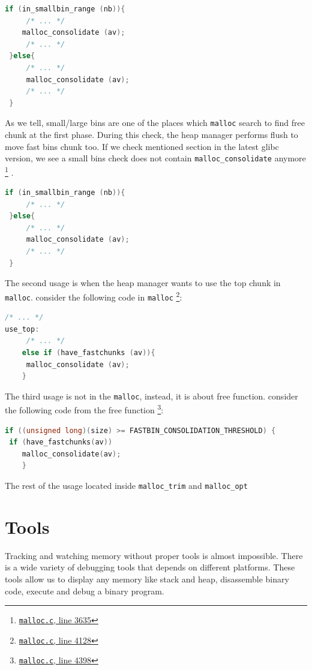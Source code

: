 \documentclass{masterthesis}
\newcommand*\libc{glibc}
\newcommand*\fb{fast bins}
\newcommand*\lb{large bins}
\newcommand*\sbs{small bins}
\newcommand*\mallocc{\lstinline{malloc}}
\begin{document}
\begin{lstlisting}[language=c,frame=tlrb]
 if (in_smallbin_range (nb)){
	 /* ... */
 	malloc_consolidate (av);
	 /* ... */
 }else{
	 /* ... */
	 malloc_consolidate (av);
	 /* ... */
 }
\end{lstlisting}

As we tell, small/\lb{} are one of the places which \mallocc{} search to find free chunk at the first phase. During this check, the heap manager performs flush to move \fb{} chunk too. If we check mentioned section in the latest \libc{} version, we see a \sbs{} check does not contain \lstinline{malloc_consolidate} anymore \footnote{\href{https://sourceware.org/git/?p=glibc.git;a=blob;f=malloc/malloc.c;h=f7cd29bc2f93e1082ee77800bd64a4b2a2897055;hb=9ea3686266dca3f004ba874745a4087a89682617\#l3635}{\texttt{malloc.c}, line 3635}} .

\begin{lstlisting}[language=c,frame=tlrb]
 if (in_smallbin_range (nb)){
 	 /* ... */
 }else{
	 /* ... */
	 malloc_consolidate (av);
	 /* ... */
 }
\end{lstlisting}

The second usage is when the heap manager wants to use the top chunk in \mallocc{}. consider the following code in \mallocc{} \footnote{\href{https://sourceware.org/git/?p=glibc.git;a=blob;f=malloc/malloc.c;h=f7cd29bc2f93e1082ee77800bd64a4b2a2897055;hb=9ea3686266dca3f004ba874745a4087a89682617\#l4128}{\texttt{malloc.c}, line 4128}}:

\begin{lstlisting}[language=c,frame=tlrb]
 /* ... */
use_top:
	 /* ... */
	else if (have_fastchunks (av)){
	 malloc_consolidate (av);
	}
\end{lstlisting}

The third usage is not in the \mallocc{}, instead, it is about free function. consider the following code from the free function \footnote{\href{https://sourceware.org/git/?p=glibc.git;a=blob;f=malloc/malloc.c;h=f7cd29bc2f93e1082ee77800bd64a4b2a2897055;hb=9ea3686266dca3f004ba874745a4087a89682617\#l4398}{\texttt{malloc.c}, line 4398}}:

\begin{lstlisting}[language=c,frame=tlrb]
if ((unsigned long)(size) >= FASTBIN_CONSOLIDATION_THRESHOLD) {
 if (have_fastchunks(av))
	malloc_consolidate(av);
	}
\end{lstlisting}

The rest of the usage located inside \lstinline{malloc_trim} and \lstinline{malloc_opt}
\chapter{Tools }
Tracking and watching memory without proper tools is almost impossible. There is a wide variety of debugging tools that depends on different platforms. These tools allow us to display any memory like stack and heap, disassemble binary code, execute and debug a binary program.
\end{document}
